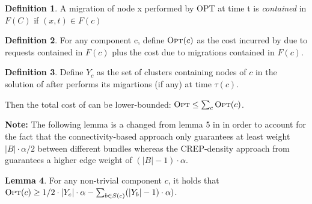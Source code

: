 \documentclass[xcolor=dvipsnames, tikz, 12pt]{article}
\newcommand{\nl}{\newline}
\newcommand{\crep}{C{\scriptsize REP}}
\newcommand{\opt}{\text{O{\scriptsize PT}}}
\theoremstyle{definition}
\newtheorem{defi}{Definition}
\newtheorem{lemma}[defi]{Lemma}
\begin{document}
	\begin{defi}
		A migration of node x performed by OPT at time t is \textit{contained} in $F(C)$ if $(x,t)\in F(c)$
	\end{defi}

	\begin{defi}
		For any component c, define $\opt{}(c)$ as the cost incurred by \opt{} due to requests contained in $F(c)$ plus the cost due to migrations contained in $F(c)$.
	\end{defi}

	\begin{defi}
		Define $Y_c$ as the set of clusters containing nodes of $c$ in the solution of \opt after \opt performs its migartions (if any) at time $\tau(c)$.
	\end{defi}
	Then the total cost of \opt{} can be lower-bounded: $\opt\leq\sum_c \opt(c)$.\nl\nl	
	
	\textbf{Note:} The following lemma is a changed from lemma 5 in \cite{Avin2015} in order to account for the fact that the connectivity-based approach only guarantees at least weight $|B|\cdot\alpha/2$ between different bundles whereas the \crep{}-density approach from \cite{Avin2015} guarantees a higher edge weight of $(|B|-1)\cdot\alpha$.

	\begin{lemma}
		\label{lem11}
		For any non-trivial component $c$, it holds that $\opt(c)\geq1/2\cdot|Y_c|\cdot\alpha-\sum_{b\in S(c)}(|Y_b|-1)\cdot\alpha)$.
	\end{lemma}
\end{document}
